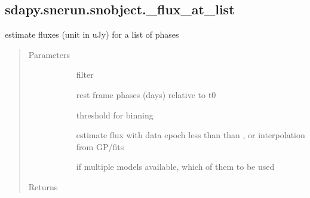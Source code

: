 \documentclass[letterpaper,10pt,english]{sphinxmanual}
\begin{document}
\subsection{sdapy.snerun.snobject.\_flux\_at\_list}
\label{\detokenize{generated/sdapy.snerun.snobject._flux_at_list:sdapy-snerun-snobject-flux-at-list}}\label{\detokenize{generated/sdapy.snerun.snobject._flux_at_list::doc}}

\begin{fulllineitems}
\label{\detokenize{generated/sdapy.snerun.snobject._flux_at_list:sdapy.snerun.snobject._flux_at_list}}
estimate fluxes (unit in uJy) for a list of phases
\begin{quote}\begin{description}
\item[{Parameters}] \leavevmode\begin{description}
\item[{}] \leavevmode{[}\sphinxtitleref{str}{]}
filter

\item[{}] \leavevmode{[}\sphinxtitleref{list}{]}
rest frame phases (days) relative to t0

\item[{}] \leavevmode{[}\sphinxtitleref{float}{]}
threshold for binning

\item[{}] \leavevmode{[}\sphinxtitleref{str}{]}
estimate flux with data epoch less than than , or interpolation from GP/fits

\item[{}] \leavevmode{[}\sphinxtitleref{int}{]}
if multiple models available, which of them to be used

\end{description}

\item[{Returns}] \leavevmode\begin{description}
\item[{}] \leavevmode{[}\sphinxtitleref{list}{]}
\item[{}] \leavevmode{[}\sphinxtitleref{list}{]}
\end{description}


\end{description}
\end{quote}
\end{fulllineitems}
\end{document}

